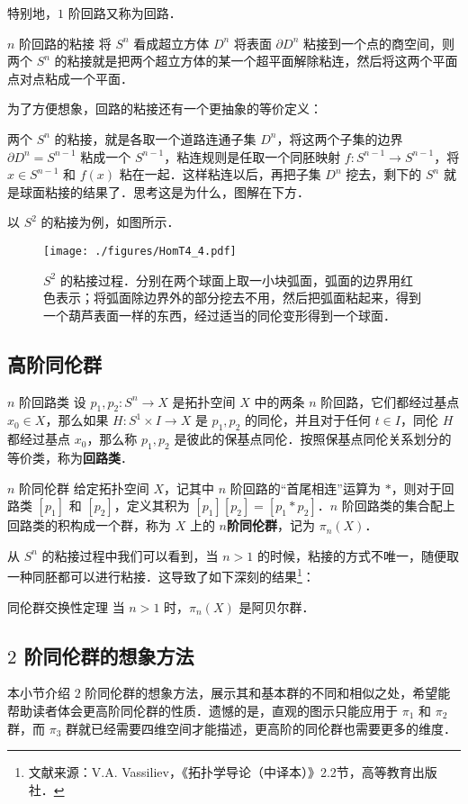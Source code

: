 特别地，$1$ 阶回路又称为回路．

\begin{definition}{$n$ 阶回路的粘接}
将 $S^n$ 看成超立方体 $D^n$ 将表面 $\partial D^n$ 粘接到一个点的商空间，则两个 $S^n$ 的粘接就是把两个超立方体的某一个超平面解除粘连，然后将这两个平面点对点粘成一个平面．
\end{definition}

为了方便想象，回路的粘接还有一个更抽象的等价定义：

\begin{exercise}{}
两个 $S^n$ 的粘接，就是各取一个道路连通子集 $D^n$，将这两个子集的边界 $\partial D^n=S^{n-1}$ 粘成一个 $S^{n-1}$，粘连规则是任取一个同胚映射 $f:S^{n-1}\rightarrow S^{n-1}$，将 $x\in S^{n-1}$ 和 $f(x)$ 粘在一起．这样粘连以后，再把子集 $D^n$ 挖去，剩下的 $S^n$ 就是球面粘接的结果了．思考这是为什么，图解在下方．
\end{exercise}

以 $S^2$ 的粘接为例，如图所示．

\begin{figure}[ht]
\centering
\texttt{[image: ./figures/HomT4\_4.pdf]}
\caption{$S^2$ 的粘接过程．分别在两个球面上取一小块弧面，弧面的边界用红色表示；将弧面除边界外的部分挖去不用，然后把弧面粘起来，得到一个葫芦表面一样的东西，经过适当的同伦变形得到一个球面．} \label{HomT4_fig4}
\end{figure}

\subsection{高阶同伦群}

\begin{definition}{$n$ 阶回路类}
设 $p_1, p_2:S^n\rightarrow X$ 是拓扑空间 $X$ 中的两条 $n$ 阶回路，它们都经过基点 $x_0\in X$，那么如果 $H:S^1\times I\rightarrow X$ 是 $p_1, p_2$ 的同伦，并且对于任何 $t\in I$，同伦 $H$ 都经过基点 $x_0$，那么称 $p_1, p_2$ 是彼此的保基点同伦．按照保基点同伦关系划分的等价类，称为\textbf{回路类}．
\end{definition}

\begin{definition}{$n$ 阶同伦群}
给定拓扑空间 $X$，记其中 $n$ 阶回路的“首尾相连”运算为 $*$，则对于回路类 $[p_1]$ 和 $[p_2]$，定义其积为 $[p_1][p_2]=[p_1*p_2]$．$n$ 阶回路类的集合配上回路类的积构成一个群，称为 $X$ 上的 $n$\textbf{阶同伦群}，记为 $\pi_n(X)$．
\end{definition}

从 $S^n$ 的粘接过程中我们可以看到，当 $n>1$ 的时候，粘接的方式不唯一，随便取一种同胚都可以进行粘接．这导致了如下深刻的结果\footnote{文献来源：V.A. Vassiliev，《拓扑学导论（中译本）》2.2节，高等教育出版社．}：

\begin{theorem}{同伦群交换性定理}
当 $n>1$ 时，$\pi_n(X)$ 是阿贝尔群．
\end{theorem}

\subsection{$2$ 阶同伦群的想象方法}

本小节介绍 $2$ 阶同伦群的想象方法，展示其和基本群的不同和相似之处，希望能帮助读者体会更高阶同伦群的性质．遗憾的是，直观的图示只能应用于 $\pi_1$ 和 $\pi_2$ 群，而 $\pi_3$ 群就已经需要四维空间才能描述，更高阶的同伦群也需要更多的维度．


